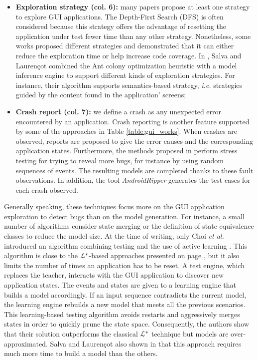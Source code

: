 \begin{itemize}
	\item \textbf{Exploration strategy (col. 6):} many
	papers propose at least one strategy to explore GUI
	applications. The Depth-First Search (DFS) is often
	considered because this strategy offers the advantage of
	resetting the application under test fewer time than any other
	strategy. Nonetheless, some works proposed different strategies
	\cite{Amalfitano:2012:UGR:2351676.2351717,5954416,crawljax:tweb12,WPX13}
	and demonstrated that it can either reduce the exploration
    time or help increase code coverage. In \cite{SP15}, Salva
	and Laurençot combined the Ant colony optimization heuristic
	with a model inference engine to support different kinds of
	exploration strategies. For instance, their algorithm
	supports semantics-based strategy, \emph{i.e.} strategies guided by
	the content found in the application' screens;

	\item \textbf{Crash report (col. 7):} we define a crash as
	any unexpected error encountered by an application.  Crash
	reporting is another feature supported by some of the
	approaches in Table \ref{table:gui_works}.  When crashes
	are observed, reports are proposed to give the error causes
	and the corresponding application states. Furthermore, the
	methods proposed in
	\cite{MobiGUITARIEEESoftware2014,guitar,SP15} perform stress
	testing for trying to reveal more bugs,  for instance by
	using random sequences of events. The resulting models are
	completed thanks to these fault observations. In addition,
	the tool \textit{AndroidRipper}
	\cite{Amalfitano:2012:UGR:2351676.2351717} generates the test
	cases for each crash observed.
\end{itemize}

Generally speaking, these techniques focus more on the GUI
application exploration to detect bugs than on the model
generation. For instance, a small number of algorithms consider
state merging or the definition of state equivalence classes to
reduce the model size. At the time of writing, only Choi \emph{et
al.} introduced an algorithm combining testing and the use of
active learning \cite{Choi2013}. This algorithm is close to the
$\EuScript{L}^*$-based approaches presented on page
\pageref{sec:active-letoile}, but it also limits the number of
times an application has to be reset. A test engine, which
replaces the teacher, interacts with the GUI application to
discover new application states. The events and states are given
to a learning engine that builds a model accordingly.  If an
input sequence contradicts the current model, the learning engine
rebuilds a new model that meets all the previous scenarios.  This
learning-based testing algorithm avoids restarts and aggressively
merges states in order to quickly prune the state space.
Consequently, the authors show that their solution outperforms
the classical $\EuScript{L}^*$ technique but models are
over-approximated.  Salva and Laurençot also shown in \cite{SP15}
that this approach requires much more time to build a model than
the others.

